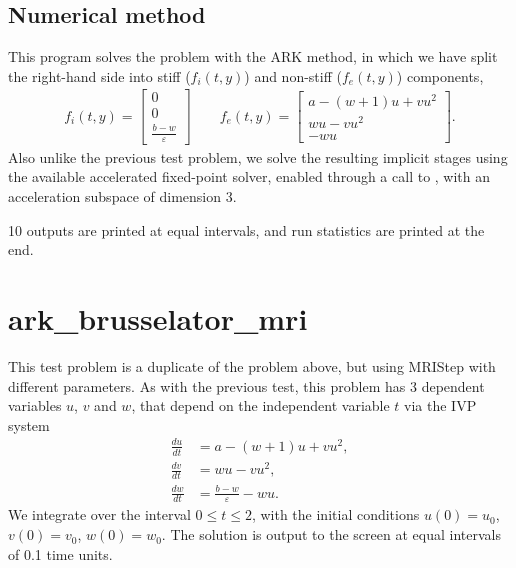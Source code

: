 \documentclass[letterpaper,10pt,english]{sphinxmanual}
\begin{document}
\subsection{Numerical method}
\label{\detokenize{c_serial:id9}}
This program solves the problem with the ARK method, in which we have
split the right-hand side into stiff (\(f_i(t,y)\)) and non-stiff
(\(f_e(t,y)\)) components,
\begin{equation*}
\begin{split}f_i(t,y) = \left[\begin{array}{c}
   0 \\ 0 \\ \frac{b-w}{\varepsilon}
\end{array}\right]
\qquad
f_e(t,y) = \left[\begin{array}{c}
   a - (w+1)u + v u^2 \\ w u - v u^2 \\ - w u
\end{array}\right].\end{split}
\end{equation*}
Also unlike the previous test problem, we solve the resulting implicit
stages using the available accelerated fixed-point solver, enabled
through a call to , with an acceleration
subspace of dimension 3.

10 outputs are printed at equal intervals, and run statistics
are printed at the end.


\section{ark\_brusselator\_mri}
\label{\detokenize{c_serial:id10}}\label{\detokenize{c_serial:ark-brusselator-mri}}
This test problem is a duplicate of the  problem
above, but using MRIStep with different parameters.  As with the
previous test, this problem has 3 dependent variables \(u\), \(v\) and
\(w\), that depend on the independent variable \(t\) via the IVP system
\begin{equation*}
\begin{split}\frac{du}{dt} &= a - (w+1)u + v u^2, \\
\frac{dv}{dt} &= w u - v u^2, \\
\frac{dw}{dt} &= \frac{b-w}{\varepsilon} - w u.\end{split}
\end{equation*}
We integrate over the interval \(0 \le t \le 2\), with the
initial conditions \(u(0) = u_0\), \(v(0) = v_0\), \(w(0)
= w_0\).  The solution is output to the screen at equal intervals of 0.1 time
units.
\end{document}
